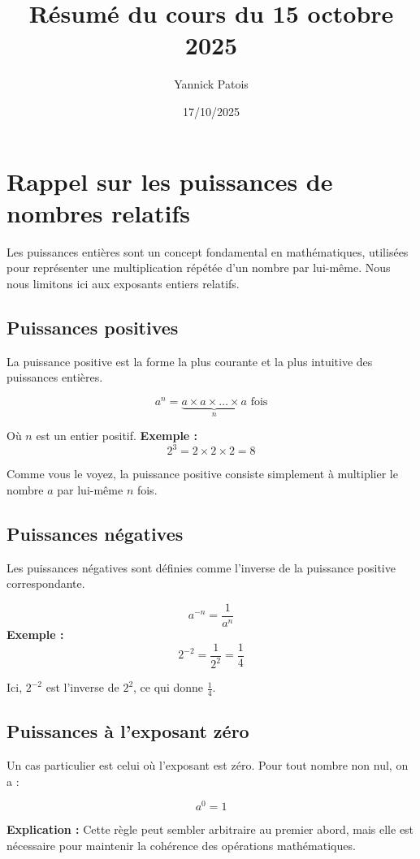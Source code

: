 \documentclass{article}
\title{Résumé du cours du 15 octobre 2025}
\author{Yannick Patois}
\date{17/10/2025}
\begin{document}
\maketitle

\section{Rappel sur les puissances de nombres relatifs}

Les puissances entières sont un concept fondamental en mathématiques, utilisées pour représenter une multiplication
répétée d'un nombre par lui-même. Nous nous limitons ici aux exposants entiers relatifs.

\subsection{Puissances positives}

La puissance positive est la forme la plus courante et la plus intuitive des puissances entières. 

\[
a^n = \underbrace{a \times a \times \dots \times a}_{n}  \text{ fois}
\]

Où \( n \) est un entier positif.
\vfill
\textbf{Exemple :}
\[
2^3 = 2 \times 2 \times 2 = 8
\]

Comme vous le voyez, la puissance positive consiste simplement à multiplier le nombre \( a \) par lui-même \( n \) fois.

\subsection{Puissances négatives}

Les puissances négatives sont définies comme l'inverse de la puissance positive correspondante.

\[
a^{-n} = \frac{1}{a^n}
\]
\vfill
\textbf{Exemple :}
\[
2^{-2} = \frac{1}{2^2} = \frac{1}{4}
\]

Ici, \( 2^{-2} \) est l'inverse de \( 2^2 \), ce qui donne \( \frac{1}{4} \).

\subsection{Puissances à l'exposant zéro}

Un cas particulier est celui où l'exposant est zéro. Pour tout nombre non nul, on a :

\[
a^0 = 1
\]

\textbf{Explication :}
Cette règle peut sembler arbitraire au premier abord, mais elle est nécessaire pour maintenir
la cohérence des opérations mathématiques.
\end{document}
